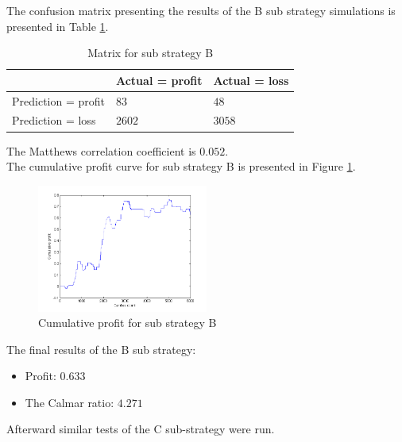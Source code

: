 \documentclass{jtacs}
\begin{document}
The confusion matrix presenting the results of the B sub strategy simulations is presented in Table \ref{tab9}.
\begin{table}[ht]
\centering
\caption{Matrix for sub strategy B}
\label{tab9}
\begin{tabular}{|l|l|l|}\hline
&	Actual = profit	& Actual = loss\\ \hline
Prediction = profit & $83$	& $48$ \\ \hline
Prediction = loss &	$2602$ &	$3058$ \\ \hline
\end{tabular}
\end{table}
\FloatBarrier
\noindent The Matthews correlation coefficient is $0.052$.\\
The cumulative profit curve for sub strategy  B is presented in Figure \ref{rys9}.
\begin{figure}[ht]
\centering
\includegraphics[width = 0.5\textwidth]{pictures/PivotPointsB.png}
\caption{Cumulative profit for sub strategy B}
\label{rys9}
\end{figure}
\FloatBarrier
The final results of the B sub strategy:
\begin{itemize}
\item Profit: $0.633$
\item The Calmar ratio: $4.271$
\end{itemize}
\vspace{1em}
\noindent Afterward similar tests of the C sub-strategy were run.\\
\end{document}
